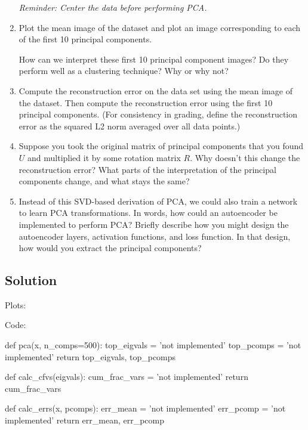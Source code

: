 \documentclass[submit]{harvardml}
\begin{document}
\begin{problem}
\begin{enumerate}
  \textit{Reminder: Center the data before performing PCA.}

\item Plot the mean image of the dataset and plot an image corresponding to each of the first 10 principal components. 

How can we interpret these first 10 principal component images? Do they perform well as a clustering technique? Why or why not?

\item Compute the reconstruction error on the data set using the mean image of the dataset.  Then compute the reconstruction error using the first 10 principal components. (For consistency in grading, define the reconstruction error as the squared L2 norm averaged over all data points.)

\item Suppose you took the original matrix of principal components
  that you found $U$ and multiplied it by some rotation matrix $R$.
  Why doesn't this change the reconstruction error?  What parts of the interpretation of the principal components change, and what stays the same?

\item Instead of this SVD-based derivation of PCA, we could also train a network to learn PCA transformations. In words, how could an autoencoder be implemented to perform PCA? Briefly describe how you might design the autoencoder layers, activation functions, and loss function. In that design, how would you extract the principal components?
  
\end{enumerate}


\end{problem}

\newpage
\subsection*{Solution}
Plots:

Code:

\begin{python}
def pca(x, n_comps=500):
    top_eigvals = 'not implemented'
    top_pcomps = 'not implemented'
    return top_eigvals, top_pcomps


def calc_cfvs(eigvals):
    cum_frac_vars = 'not implemented'
    return cum_frac_vars


def calc_errs(x, pcomps):
    err_mean = 'not implemented'
    err_pcomp = 'not implemented'
    return err_mean, err_pcomp
\end{python}
\end{document}
